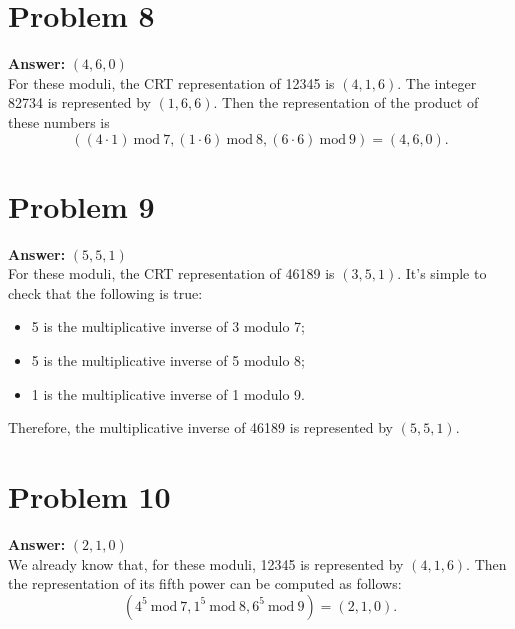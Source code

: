 \documentclass[11pt]{article}
\newcommand{\Mod}{\mathrm{mod}\:}
\begin{document}
\section*{Problem 8}
\label{sec:orgb6fc81b}
\textbf{Answer:} \((4,6,0)\)\\

For these moduli, the CRT representation of 12345 is \((4,1,6)\). The integer
82734 is represented by \((1,6,6)\). Then the representation of the product of
these numbers is
\begin{equation}
((4\cdot 1)\:\Mod 7,(1\cdot 6)\:\Mod 8,(6\cdot 6)\:\Mod 9)=(4,6,0).
\end{equation}
\section*{Problem 9}
\label{sec:org31b7cfc}
\textbf{Answer:} \((5,5,1)\)\\

For these moduli, the CRT representation of 46189 is \((3,5,1)\). It's simple
to check that the following is true:
\begin{itemize}
\item 5 is the multiplicative inverse of 3 modulo 7;
\item 5 is the multiplicative inverse of 5 modulo 8;
\item 1 is the multiplicative inverse of 1 modulo 9.
\end{itemize}
Therefore, the multiplicative inverse of 46189 is represented by \((5,5,1)\).
\section*{Problem 10}
\label{sec:orgb9fd7ea}
\textbf{Answer:} \((2,1,0)\)\\

We already know that, for these moduli, 12345 is represented by \((4,1,6)\).
Then the representation of its fifth power can be computed as follows:
\begin{equation}
(4^5\:\Mod 7,1^5\:\Mod 8,6^5\:\Mod 9)=(2,1,0).
\end{equation}
\end{document}

